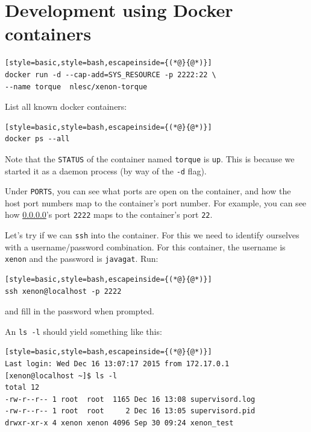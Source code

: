 \documentclass[12pt, a4paper, twoside, openany, titlepage]{book}
\begin{document}


\section{Development using Docker containers}



\begin{lstlisting}[style=basic,style=bash,escapeinside={(*@}{@*)}]
docker run -d --cap-add=SYS_RESOURCE -p 2222:22 \
--name torque  nlesc/xenon-torque
\end{lstlisting}

List all known docker containers:
\begin{lstlisting}[style=basic,style=bash,escapeinside={(*@}{@*)}]
docker ps --all
\end{lstlisting}
Note that the \texttt{STATUS} of the container named \texttt{torque} is \texttt{up}. This is because we started it as a daemon process (by way of the \texttt{-d} flag).

Under \texttt{PORTS}, you can see what ports are open on the container, and how the host port numbers map to the container's port number. For example, you can see how \url{0.0.0.0}'s port \texttt{2222} maps to the container's port \texttt{22}.

Let's try if we can \texttt{ssh} into the container. For this we need to identify ourselves with a username/password combination. For this container, the username is \texttt{xenon} and the password is \texttt{javagat}. Run:
\begin{lstlisting}[style=basic,style=bash,escapeinside={(*@}{@*)}]
ssh xenon@localhost -p 2222
\end{lstlisting}
and fill in the password when prompted.


An \texttt{ls -l} should yield something like this:
\begin{lstlisting}[style=basic,style=bash,escapeinside={(*@}{@*)}]
Last login: Wed Dec 16 13:07:17 2015 from 172.17.0.1
[xenon@localhost ~]$ ls -l
total 12
-rw-r--r-- 1 root  root  1165 Dec 16 13:08 supervisord.log
-rw-r--r-- 1 root  root     2 Dec 16 13:05 supervisord.pid
drwxr-xr-x 4 xenon xenon 4096 Sep 30 09:24 xenon_test
\end{lstlisting} %
\end{document}
